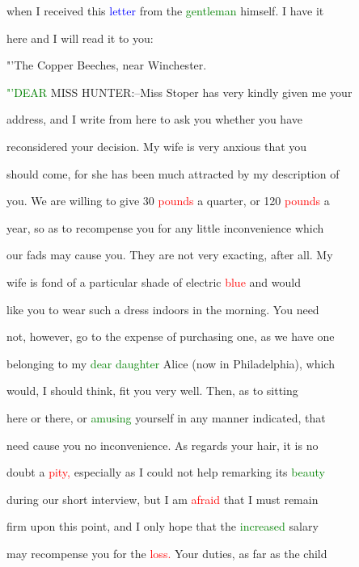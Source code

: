  when I received this \textcolor{blue}{letter} from the \textcolor{green}{gentleman} himself. I have it

 here and I will read it to you:



 "'The Copper Beeches, near Winchester.

 \textcolor{green}{"'DEAR} MISS HUNTER:--Miss Stoper has very kindly given me your

 address, and I write from here to ask you whether you have

 reconsidered your decision. My wife is very \textcolor{BurntOrange}{anxious} that you

 should come, for she has been much attracted by my description of

 you. We are willing to give 30 \textcolor{red}{pounds} a quarter, or 120 \textcolor{red}{pounds} a

 year, so as to recompense you for any little inconvenience which

 our fads may cause you. They are not very exacting, after all. My

 wife is fond of a particular shade of \textcolor{BurntOrange}{electric} \textcolor{red}{blue} and would

 like you to \textcolor{BurntOrange}{wear} such a dress indoors in the morning. You need

 not, however, go to the expense of purchasing one, as we have one

 belonging to my \textcolor{green}{dear} \textcolor{green}{daughter} Alice (now in Philadelphia), which

 would, I should think, fit you very well. Then, as to sitting

 here or there, or \textcolor{green}{amusing} yourself in any manner indicated, that

 need cause you no inconvenience. As regards your hair, it is no

 \textcolor{BurntOrange}{doubt} a \textcolor{red}{pity,} especially as I could not help remarking its \textcolor{green}{beauty}

 during our short interview, but I am \textcolor{red}{afraid} that I must remain

 firm upon this point, and I only \textcolor{BurntOrange}{hope} that the \textcolor{green}{increased} \textcolor{BurntOrange}{salary}

 may recompense you for the \textcolor{red}{loss.} Your duties, as far as the \textcolor{BurntOrange}{child}

